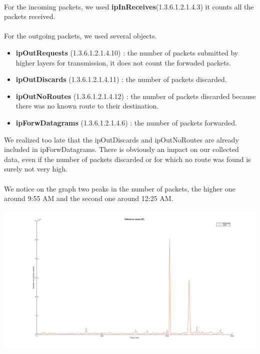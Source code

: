\documentclass[a4paper,titlepage]{article}
\begin{document}
\paragraph{}
For the incoming packets, we used \textbf{ipInReceives}(1.3.6.1.2.1.4.3) it counts all the packets received. 
\paragraph{}
For the outgoing packets, we used several objects. 
\begin{itemize}
\item \textbf{ipOutRequests} (1.3.6.1.2.1.4.10) : the number of packets submitted by higher layers for transmission, it does not count the forwaded packets.
\item \textbf{ipOutDiscards} (1.3.6.1.2.1.4.11) : the number of packets discarded.
\item \textbf{ipOutNoRoutes} (1.3.6.1.2.1.4.12) : the number of packets discarded because there was no known route to their destination.
\item \textbf{ipForwDatagrams} (1.3.6.1.2.1.4.6) : the number of packets forwarded. 
\end{itemize}
We realized too late that the ipOutDiscards and ipOutNoRoutes are already included in ipForwDatagrams. There is obviously an impact on our collected data, even if the number of packets discarded or for which no route was found is surely not very high.
\paragraph{}
We notice on the graph two peaks in the number of packets, the higher one around 9:55 AM and the second one around 12:25 AM.
\begin{center}
	\includegraphics[scale=0.4, trim = 50mm 0mm 0mm 0mm, clip]{Difference_value_ip.png}
\end{center}
\end{document}
